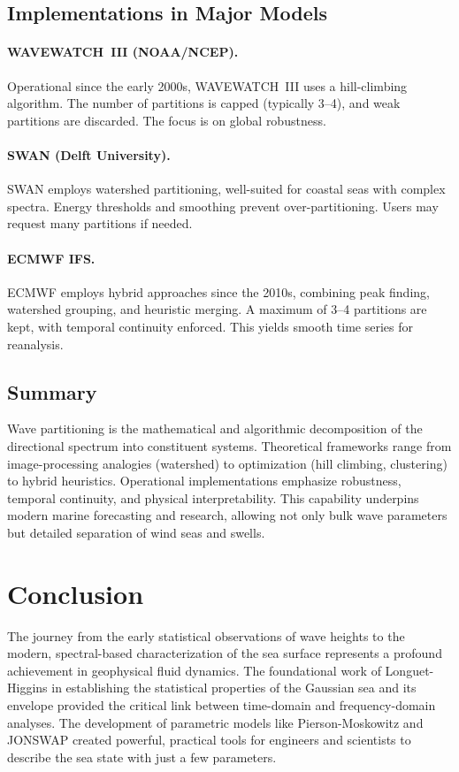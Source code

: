 \documentclass[12pt]{article}
\begin{document}
\subsection{Implementations in Major Models}
\paragraph{WAVEWATCH~III (NOAA/NCEP).}
Operational since the early 2000s, WAVEWATCH~III uses a hill-climbing algorithm. The number of partitions is capped (typically 3--4), and weak partitions are discarded. The focus is on global robustness.

\paragraph{SWAN (Delft University).}
SWAN employs watershed partitioning, well-suited for coastal seas with complex spectra. Energy thresholds and smoothing prevent over-partitioning. Users may request many partitions if needed.

\paragraph{ECMWF IFS.}
ECMWF employs hybrid approaches since the 2010s, combining peak finding, watershed grouping, and heuristic merging. A maximum of 3--4 partitions are kept, with temporal continuity enforced. This yields smooth time series for reanalysis.

\subsection{Summary}
Wave partitioning is the mathematical and algorithmic decomposition of the directional spectrum into constituent systems. Theoretical frameworks range from image-processing analogies (watershed) to optimization (hill climbing, clustering) to hybrid heuristics. Operational implementations emphasize robustness, temporal continuity, and physical interpretability. This capability underpins modern marine forecasting and research, allowing not only bulk wave parameters but detailed separation of wind seas and swells.

\section{Conclusion}
The journey from the early statistical observations of wave heights to the modern, spectral-based characterization of the sea surface represents a profound achievement in geophysical fluid dynamics. The foundational work of Longuet-Higgins in establishing the statistical properties of the Gaussian sea and its envelope provided the critical link between time-domain and frequency-domain analyses. The development of parametric models like Pierson-Moskowitz and JONSWAP created powerful, practical tools for engineers and scientists to describe the sea state with just a few parameters.
\end{document}
